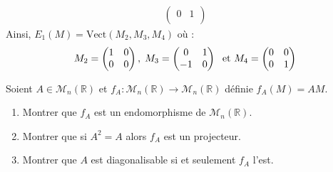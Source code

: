 \documentclass[a4paper,10pt]{report}
\begin{document}
\begin{enumerate}
\begin{itemize}
\begin{align*}
\begin{pmatrix}
0 & 1 \\ 
\end{pmatrix} 
\end{align*}
Ainsi, $E_1(M) = \textrm{Vect}(M_2,M_3,M_4)$ où :
$$ M_2 = \begin{pmatrix} 1 & 0 \\
0 & 0 \\ 
\end{pmatrix} , \; M_3= \begin{pmatrix}
0 & 1 \\
-1 & 0
\end{pmatrix} \; \hbox{ et } M_4 = \begin{pmatrix} 0 & 0 \\
0 & 1 \\ 
\end{pmatrix}  $$
\end{itemize}
\end{enumerate}

\begin{Exa} Soient $A \in \mathcal{M}_n(\mathbb{R})$ et $f_A : \mathcal{M}_n(\mathbb{R}) \rightarrow \mathcal{M}_n(\mathbb{R})$ définie $f_A(M)=AM$.

\begin{enumerate}
\item Montrer que $f_A$ est un endomorphisme de $\mathcal{M}_n(\mathbb{R})$.
\item Montrer que si $A^2=A$ alors $f_A$ est un projecteur.
\item Montrer que $A$ est diagonalisable si et seulement $f_A$ l'est.
\end{enumerate}
\end{Exa}

\corr 
\end{document}

